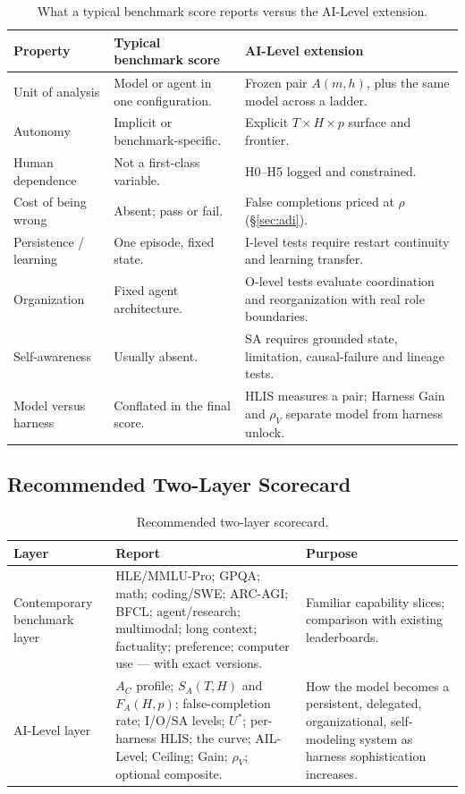 \documentclass[11pt]{article}
\theoremstyle{definition}
\newcommand{\SA}{\ensuremath{S_A(T,H)}}
\newcommand{\FA}{\ensuremath{F_A(H,p)}}
\newcommand{\rhov}{\ensuremath{\rho_V}}
\begin{document}
\begin{table}[!htbp]
\centering\small
\begin{tabularx}{\textwidth}{@{}lYY@{}}
\toprule
Property & Typical benchmark score & AI-Level extension \\
\midrule
Unit of analysis & Model or agent in one configuration. & Frozen pair $A(m,h)$, plus the same model across a ladder. \\
Autonomy & Implicit or benchmark-specific. & Explicit $T \times H \times p$ surface and frontier. \\
Human dependence & Not a first-class variable. & H0--H5 logged and constrained. \\
Cost of being wrong & Absent; pass or fail. & False completions priced at $\rho$ (\S\ref{sec:adi}). \\
Persistence / learning & One episode, fixed state. & I-level tests require restart continuity and learning transfer. \\
Organization & Fixed agent architecture. & O-level tests evaluate coordination and reorganization with real role boundaries. \\
Self-awareness & Usually absent. & SA requires grounded state, limitation, causal-failure and lineage tests. \\
Model versus harness & Conflated in the final score. & HLIS measures a pair; Harness Gain and \rhov{} separate model from harness unlock. \\
\bottomrule
\end{tabularx}
\caption{What a typical benchmark score reports versus the AI-Level extension.}
\label{tab:hilext}
\end{table}

\subsection{Recommended Two-Layer Scorecard}

\begin{table}[!htbp]
\centering\small
\begin{tabularx}{\textwidth}{@{}lYY@{}}
\toprule
Layer & Report & Purpose \\
\midrule
Contemporary benchmark layer & HLE/MMLU-Pro; GPQA; math; coding/SWE; ARC-AGI; BFCL; agent/research; multimodal; long context; factuality; preference; computer use --- with exact versions. & Familiar capability slices; comparison with existing leaderboards. \\
AI-Level layer & $A_C$ profile; \SA{} and \FA{}; false-completion rate; I/O/SA levels; $U^{*}$; per-harness HLIS; the curve; AIL-Level; Ceiling; Gain; \rhov{}; optional composite. & How the model becomes a persistent, delegated, organizational, self-modeling system as harness sophistication increases. \\
\bottomrule
\end{tabularx}
\caption{Recommended two-layer scorecard.}
\label{tab:twolayer}
\end{table}
\end{document}
